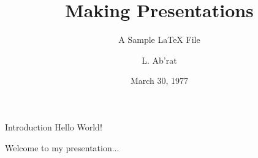 \documentclass[10pt,twocolumn]{beamer}
\title{Making Presentations}
\subtitle{A Sample LaTeX File}
\author{L. Ab'rat}
\institute[RHUL]{Royal Holloway, University of London}
\date{March 30, 1977}
\begin{document}
\begin{frame}
  \titlepage
\end{frame}

\begin{frame}{Introduction}
  Hello World!

  Welcome to my presentation...
\end{frame}
\end{document}

